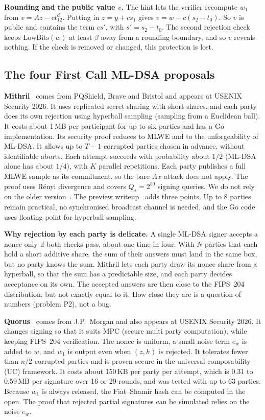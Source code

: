 \documentclass[10pt,conference,a4paper]{IEEEtran}
\newcommand{\LB}{\mathrm{LowBits}}
\begin{document}
\textbf{Rounding and the public value $v$.} The hint lets the verifier recompute $w_1$ from $v=Az-ct_12^d$. Putting in
$z=y+cs_1$ gives $v=w-c(s_2-t_0)$. So $v$ is public and contains the term $cs'$, with $s'=s_2-t_0$. The second rejection
check keeps $\LB(w)$ at least $\beta$ away from a rounding boundary, and so $v$ reveals nothing. If the check is removed or
changed, this protection is lost.

\subsection{The four First Call ML-DSA proposals}

\textbf{Mithril}~\cite{mithril,mithrilposter,mithrilpw} comes from PQShield, Brave and Bristol and appears at USENIX
Security 2026. It uses replicated secret sharing with short shares, and each party does its own rejection using hyperball
sampling (sampling from a Euclidean ball). It costs about 1\,MB per participant for up to six parties and has a Go
implementation. Its security proof reduces to MLWE and to the unforgeability of ML-DSA. It allows up to $T-1$ corrupted
parties chosen in advance, without identifiable aborts. Each attempt succeeds with probability about $1/2$ (ML-DSA alone
has about $1/4$), with $K$ parallel repetitions. Each party publishes a full MLWE sample as its commitment, so the bare $Ax$
attack does not apply. The proof uses R\'enyi divergence and covers $Q_s=2^{50}$ signing queries. We do not rely on the
older version~\cite{reloaded}. The preview writeup~\cite{mithrilpw} adds three points. Up to 8 parties remain practical,
no synchronised broadcast channel is needed, and the Go code uses floating point for hyperball sampling.

\textbf{Why rejection by each party is delicate.} A single ML-DSA signer accepts a nonce only if both checks pass, about one
time in four. With $N$ parties that each hold a short additive share, the sum of their answers must land in the same box,
but no party knows the sum. Mithril lets each party draw its nonce share from a hyperball, so that the sum has a
predictable size, and each party decides acceptance on its own. The accepted answers are then close to the FIPS~204
distribution, but not exactly equal to it. How close they are is a question of numbers (problem P2), not a bug.

\textbf{Quorus}~\cite{quorus} comes from J.P.\ Morgan and also appears at USENIX Security 2026. It changes signing so that
it suits MPC (secure multi party computation), while keeping FIPS~204 verification. The nonce is uniform, a small noise
term $e_w$ is added to $w$, and $w_1$ is output even when $(z,h)$ is rejected. It tolerates fewer than $n/2$ corrupted
parties and is proven secure in the universal composability (UC) framework. It costs about 150\,KB per party per attempt,
which is 0.31 to 0.59\,MB per signature over 16 or 29 rounds, and was tested with up to 63 parties. Because $w_1$ is always
released, the Fiat--Shamir hash can be computed in the open. The proof that rejected partial signatures can be simulated
relies on the noise $e_w$.
\end{document}
